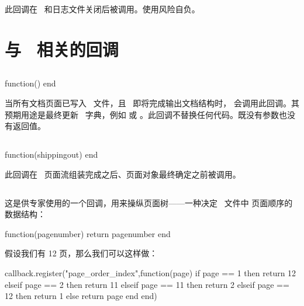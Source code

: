 
此回调在 \PDF\ 和日志文件关闭后被调用。使用风险自负。

\section{与 \PDF\ 相关的回调}

\subsection{}


\begin{typing}
function()
end
\end{typing}

当所有文档页面已写入 \PDF\ 文件，且 \LUATEX\ 即将完成输出文档结构时，
会调用此回调。其预期用途是最终更新 \PDF\ 字典，例如 
或 。此回调不替换任何代码。既没有参数也没有返回值。

\subsection{}


\begin{typing}
function(shippingout)
end
\end{typing}

此回调在 \PDF\ 页面流组装完成之后、页面对象最终确定之前被调用。

\subsection{}


这是供专家使用的一个回调，用来操纵页面树——一种决定 \PDF\ 文件中
页面顺序的数据结构：

\begin{typing}
function(pagenumber)
  return pagenumber
end
\end{typing}

假设我们有 12 页，那么我们可以这样做：

\begin{typing}
callback.register("page_order_index",function(page)
        if page ==  1 then return 12
    elseif page ==  2 then return 11
    elseif page == 11 then return  2
    elseif page == 12 then return  1
    else                   return page
    end
end)
\end{typing}

